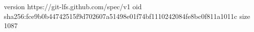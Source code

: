 version https://git-lfs.github.com/spec/v1
oid sha256:fce9b0b44742515f9d702607a51498e01f74bf1110242084fe8bc0f811a1011c
size 1087
